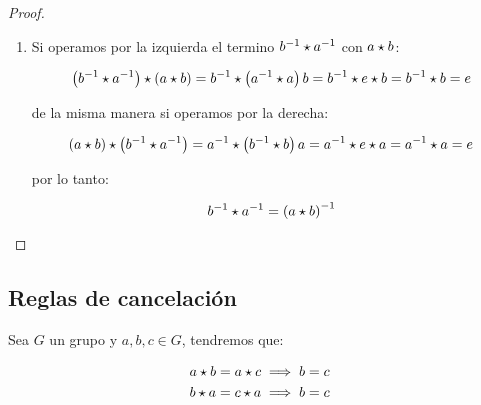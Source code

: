 \begin{proof}
\begin{enumerate}
                \item Si operamos por la izquierda el termino $b^{-1} \star a^{-1}$ con $a \star b$:

                \begin{equation*}
                    \left( b^{-1} \star a^{-1} \right) \star \left( a \star b \right) = b^{-1} \star \left( a^{-1} \star a \right) b = b^{-1} \star e \star b = b^{-1} \star b = e
                \end{equation*}

                de la misma manera si operamos por la derecha:

                \begin{equation*}
                    \left( a \star b \right) \star \left( b^{-1} \star a^{-1} \right) = a^{-1} \star \left( b^{-1} \star b \right) a = a^{-1} \star e \star a = a^{-1} \star a = e
                \end{equation*}

                por lo tanto:

                \begin{equation*}
                    b^{-1} \star a^{-1} = \left( a \star b \right)^{-1}
                \end{equation*}

            \end{enumerate}
        \end{proof}

    \newpage
    \subsection{Reglas de cancelación}

        \begin{proposicion}
            Sea $G$ un grupo y $a, b, c \in G$, tendremos que:

            \begin{align}
                a \star b = a \star c &\implies b = c \nonumber \\
                b \star a = c \star a &\implies b = c
            \end{align}
        \end{proposicion}

